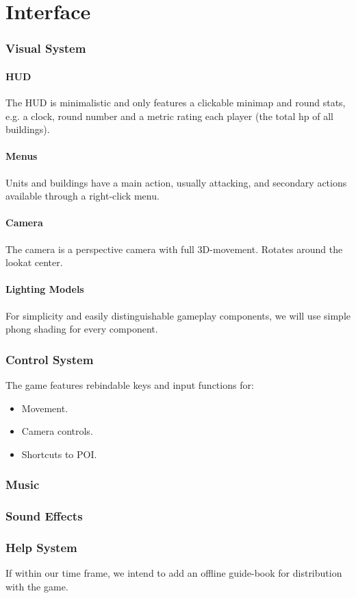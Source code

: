 \part{Interface}
\section{Visual System}
\subsection{HUD} %
The HUD is minimalistic and only features a clickable minimap and round stats, e.g.
a clock, round number and a metric rating each player (the total hp of all buildings).
\subsection{Menus} %
Units and buildings have a main action, usually attacking, and secondary actions available
through a right-click menu.
\subsection{Camera} %
The camera is a perspective camera with full 3D-movement. Rotates around the lookat center.
\subsection{Lighting Models} %
For simplicity and easily distinguishable gameplay components, we will use simple phong shading
for every component.
\section{Control System} %
The game features rebindable keys and input functions for:

\begin{itemize}
    \item Movement.
    \item Camera controls.
    \item Shortcuts to POI.
\end{itemize}
\section{Music} %
\section{Sound Effects} %
\section{Help System} %
If within our time frame, we intend to add an offline guide-book for distribution with the game.
